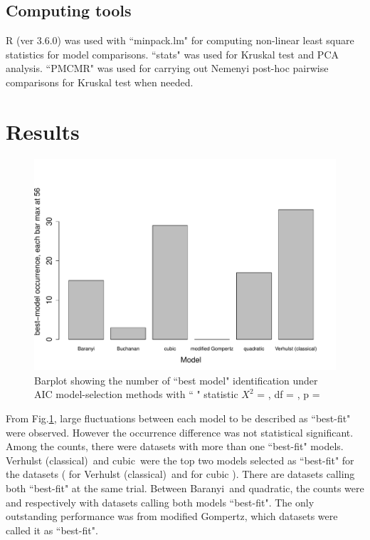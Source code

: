 \documentclass[a4paper, 11pt]{article}
\newcommand{\fve}{Verhulst (classical)}
\newcommand{\fgo}{modified Gompertz}
\newcommand{\fba}{Baranyi}
\newcommand{\fqu}{quadratic}
\newcommand{\fcu}{cubic}
\begin{document}
	\subsection*{Computing tools}
	R (ver 3.6.0)\autocite{Rcore} was used with ``minpack.lm"\autocite{minpacklm} for computing non-linear least square statistics for model comparisons.  ``stats"\autocite{Rcore} was used for Kruskal test and PCA analysis.  ``PMCMR"\autocite{PMCMR} was used for carrying out Nemenyi post-hoc pairwise comparisons for Kruskal test when needed.
	
	\section*{Results}
	\begin{figure}[H]
		\centering
		\includegraphics[width=.8\linewidth]{../results/barplot_BestModel.pdf}
		\caption{Barplot showing the number of ``best model" identification under AIC model-selection methods with ``
			" statistic $X^{2}$ = 
			, df = 
			, p = 
		}\label{barPT}
	\end{figure}
	From Fig.\ref{barPT}, large fluctuations between each model to be described as ``best-fit" were observed.  However the occurrence difference was not statistical significant.  Among the counts, there were 
	datasets with more than one ``best-fit" models.  \fve\ and \fcu\ were the top two models selected as ``best-fit" for the 
	 datasets (
	  for \fve\ and 
	  for \fcu
	 ).  There are 
	  datasets calling both ``best-fit" at the same trial.  Between \fba\ and \fqu, the counts were 
	  and 
	  respectively with 
	 datasets calling both models ``best-fit".  The only outstanding performance was from \fgo, which 
	  datasets were called it as ``best-fit".\\
	  
\end{document}
